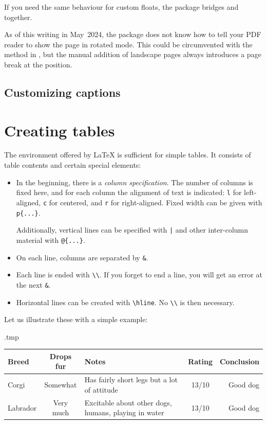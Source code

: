 If you need the same behaviour for custom floats,
the \mbox{} package bridges  and  together.

As of this writing in May~2024, the package does not know how to tell your PDF reader
to show the page in rotated mode.
This could be circumvented with the method in ,
but the manual addition of landscape pages always introduces a page break at the position.



%
%
\subsection{Customizing captions}





%
%
%
\section{Creating tables}

The  environment offered by \LaTeX{} is sufficient for simple tables.
It consists of table contents and certain special elements:
\begin{itemize}
\item In the beginning, there is a \emph{column specification}.
    The number of columns is fixed here, and for each column the alignment of text is indicated:
    \verb|l| for left-aligned, \verb|c| for centered, and \verb|r| for right-aligned.
    Fixed width can be given with \verb|p{...}|.

    Additionally, vertical lines can be specified with \verb+|+ and
    other inter-column material with \verb|@{...}|.
\item On each line, columns are separated by \verb|&|.
\item Each line is ended with \verb|\\|.
    If you forget to end a line, you will get an error at the next \verb|&|.
\item Horizontal lines can be created with \verb|\hline|.
    No \verb|\\| is then necessary.
\end{itemize}
%
Let us illustrate these with a simple example:
%
\begin{VerbatimOut}{\jobname.tmp}
\begin{tabular}{l| c p{3cm} c @{ $\Rightarrow$ } r}
Breed & Drops fur & Notes & Rating & Conclusion\\
\hline
Corgi & Somewhat & Has fairly short legs but a lot of attitude
    & 13/10 & Good dog\\
Labrador & Very much & Excitable about other dogs, humans, playing in water
    & 13/10 & Good dog
\end{tabular}
\end{VerbatimOut}
\ShowExampleBelow

